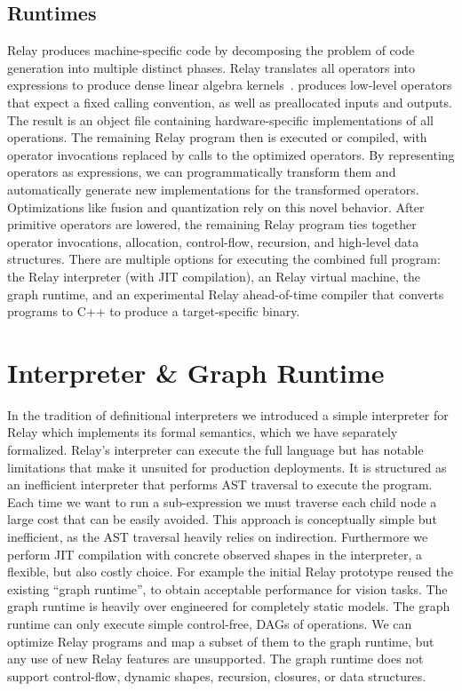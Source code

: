\subsection{Runtimes}

Relay produces machine-specific code
    by decomposing the problem of code generation into multiple distinct phases.
Relay translates all operators into \tvm expressions
    to produce dense linear algebra kernels~\citep{tvm_osdi18, tensor_comprehensions, halide}.
\tvm produces low-level operators that expect a fixed calling convention,
    as well as preallocated inputs and outputs.
The result is an object file containing hardware-specific implementations of all
    operations.
The remaining Relay program then is executed or compiled,
    with operator invocations replaced by calls to the optimized operators.
By representing operators as \tvm expressions, we can programmatically
    transform them and automatically generate new implementations for the transformed operators.
Optimizations like fusion and quantization
    rely on this novel behavior.
After primitive operators are lowered,
    the remaining Relay program ties
    together operator invocations, allocation, control-flow,
    recursion, and high-level data structures.
There are multiple options for executing the combined full program:
    the Relay interpreter (with JIT compilation),
    an Relay virtual machine,
    the \tvm graph runtime,
    and an experimental Relay ahead-of-time compiler
    that converts programs to C++ to produce a target-specific binary.

\section{Interpreter \& Graph Runtime}
\label{sec:interp_graph_rt}

In the tradition of definitional interpreters we introduced
  a simple interpreter for Relay which implements its formal semantics, which
  we have separately formalized.
Relay’s interpreter can execute the full language but has notable limitations
  that make it unsuited for production deployments.
It is structured as an inefficient interpreter that performs
  AST traversal to execute the program.
Each time we want to run a sub-expression we must traverse each child node
  a large cost that can be easily avoided.
This approach is conceptually simple but inefficient, as
  the AST traversal heavily relies on indirection.
Furthermore we perform JIT compilation with concrete observed shapes
  in the interpreter, a flexible, but also costly choice.
For example the initial Relay prototype reused the existing ``graph runtime'', to obtain
  acceptable performance for vision tasks.
The graph runtime is heavily over engineered for completely static
  models.
The graph runtime can only execute simple control-free,
    DAGs of operations.
We can optimize Relay programs and map a subset of them
    to the graph runtime, but any use of new Relay features
    are unsupported.
The graph runtime does not support control-flow, dynamic shapes,
  recursion, closures, or data structures.

